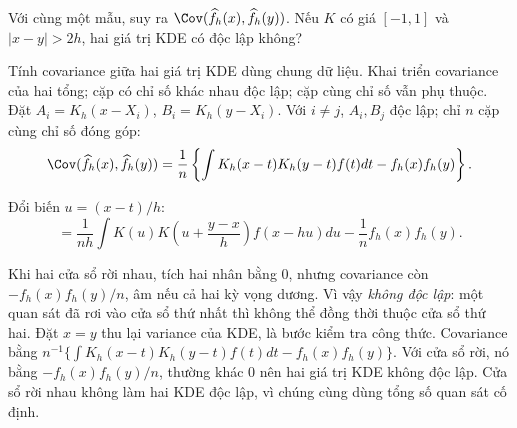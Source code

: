 \begin{problem}\label{k:49}
Với cùng một mẫu, suy ra $\Cov(\widehat f_h(x),\widehat f_h(y))$. Nếu $K$ có giá $[-1,1]$ và $|x-y|>2h$, hai giá trị KDE có độc lập không?
\end{problem}
\begin{solution}
Tính covariance giữa hai giá trị KDE dùng chung dữ liệu.
Khai triển covariance của hai tổng; cặp có chỉ số khác nhau độc lập; cặp cùng chỉ số vẫn phụ thuộc.
Đặt $A_i=K_h(x-X_i)$, $B_i=K_h(y-X_i)$. Với $i\ne j$, $A_i,B_j$ độc lập; chỉ $n$ cặp cùng chỉ số đóng góp:
\[
 \Cov(\widehat f_h(x),\widehat f_h(y))
 =\frac1n\left\{\int K_h(x-t)K_h(y-t)f(t)dt-f_h(x)f_h(y)\right\}.
\]

Đổi biến $u=(x-t)/h$:
\[
 =\frac1{nh}\int K(u)K\!\left(u+\frac{y-x}{h}\right)f(x-hu)du
 -\frac1nf_h(x)f_h(y).
\]

Khi hai cửa sổ rời nhau, tích hai nhân bằng 0, nhưng covariance còn
$-f_h(x)f_h(y)/n$, âm nếu cả hai kỳ vọng dương. Vì vậy \emph{không độc lập}: một quan sát đã rơi vào cửa sổ thứ nhất thì không thể đồng thời thuộc cửa sổ thứ hai. Đặt $x=y$ thu lại variance của KDE, là bước kiểm tra công thức.
Covariance bằng $n^{-1}\{\int K_h(x-t)K_h(y-t)f(t)dt-f_h(x)f_h(y)\}$. Với cửa sổ rời, nó bằng $-f_h(x)f_h(y)/n$, thường khác 0 nên hai giá trị KDE không độc lập.
Cửa sổ rời nhau không làm hai KDE độc lập, vì chúng cùng dùng tổng số quan sát cố định.
\end{solution}

